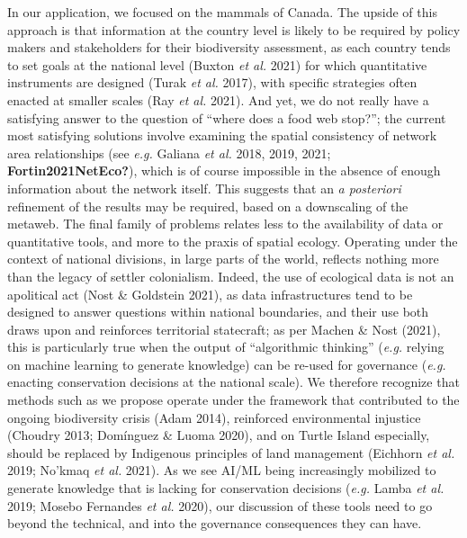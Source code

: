 \documentclass[11pt]{article}
\begin{document}
In our application, we focused on the mammals of Canada. The upside of
this approach is that information at the country level is likely to be
required by policy makers and stakeholders for their biodiversity
assessment, as each country tends to set goals at the national level
(Buxton \emph{et al.} 2021) for which quantitative instruments are
designed (Turak \emph{et al.} 2017), with specific strategies often
enacted at smaller scales (Ray \emph{et al.} 2021). And yet, we do not
really have a satisfying answer to the question of ``where does a food
web stop?''; the current most satisfying solutions involve examining the
spatial consistency of network area relationships (see \emph{e.g.}
Galiana \emph{et al.} 2018, 2019, 2021; \textbf{Fortin2021NetEco?}),
which is of course impossible in the absence of enough information about
the network itself. This suggests that an \emph{a posteriori} refinement
of the results may be required, based on a downscaling of the metaweb.
The final family of problems relates less to the availability of data or
quantitative tools, and more to the praxis of spatial ecology. Operating
under the context of national divisions, in large parts of the world,
reflects nothing more than the legacy of settler colonialism. Indeed,
the use of ecological data is not an apolitical act (Nost \& Goldstein
2021), as data infrastructures tend to be designed to answer questions
within national boundaries, and their use both draws upon and reinforces
territorial statecraft; as per Machen \& Nost (2021), this is
particularly true when the output of ``algorithmic thinking''
(\emph{e.g.} relying on machine learning to generate knowledge) can be
re-used for governance (\emph{e.g.} enacting conservation decisions at
the national scale). We therefore recognize that methods such as we
propose operate under the framework that contributed to the ongoing
biodiversity crisis (Adam 2014), reinforced environmental injustice
(Choudry 2013; Domínguez \& Luoma 2020), and on Turtle Island
especially, should be replaced by Indigenous principles of land
management (Eichhorn \emph{et al.} 2019; No'kmaq \emph{et al.} 2021). As
we see AI/ML being increasingly mobilized to generate knowledge that is
lacking for conservation decisions (\emph{e.g.} Lamba \emph{et al.}
2019; Mosebo Fernandes \emph{et al.} 2020), our discussion of these
tools need to go beyond the technical, and into the governance
consequences they can have.
\end{document}

